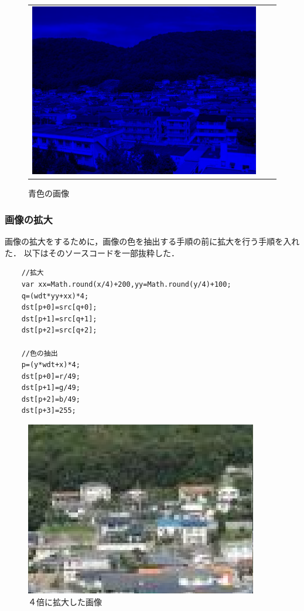 \documentclass[11pt]{jarticle}
\begin{document}
\begin{figure}[htbp]
\begin{tabular}{ccc}
\begin{minipage}{0.33\hsize}
\begin{center}
                \caption{緑色の画像}
            \end{center}
        \end{minipage}
        \begin{minipage}{0.33\hsize}
            \begin{center}
                \includegraphics[scale=.3]{1-4-2.png}
                \caption{青色の画像}
            \end{center}
        \end{minipage}
    \end{tabular}
\end{figure}

\subsubsection{画像の拡大}

画像の拡大をするために，画像の色を抽出する手順の前に拡大を行う手順を入れた．
以下はそのソースコードを一部抜粋した．

\begin{verbatim}
    //拡大
    var xx=Math.round(x/4)+200,yy=Math.round(y/4)+100;
    q=(wdt*yy+xx)*4;
    dst[p+0]=src[q+0];
    dst[p+1]=src[q+1];
    dst[p+2]=src[q+2];

    //色の抽出
    p=(y*wdt+x)*4;
    dst[p+0]=r/49;
    dst[p+1]=g/49;
    dst[p+2]=b/49;
    dst[p+3]=255;
\end{verbatim}
\begin{figure}[h]
    \centering
    \includegraphics[scale=.3]{1-4-3.png}
    \caption{４倍に拡大した画像}
\end{figure}
\end{document}
